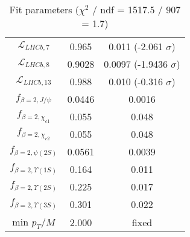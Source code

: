 \begin{table}[h!]
\begin{tabular}{c|c|c}
$\mathcal L_{LHCb,7}$ & 0.965 & 0.011 (-2.061 $\sigma$) \\
$\mathcal L_{LHCb,8}$ & 0.9028 & 0.0097 (-1.9436 $\sigma$) \\
$\mathcal L_{LHCb,13}$ & 0.988 & 0.010 (-0.316 $\sigma$) \\
$f_{\beta=2,J/\psi}$ & 0.0446 & 0.0016 \\
$f_{\beta=2,\chi_{c1}}$ & 0.055 & 0.048 \\
$f_{\beta=2,\chi_{c2}}$ & 0.055 & 0.048 \\
$f_{\beta=2,\psi(2S)}$ & 0.0561 & 0.0039 \\
$f_{\beta=2,\Upsilon(1S)}$ & 0.164 & 0.011 \\
$f_{\beta=2,\Upsilon(2S)}$ & 0.225 & 0.017 \\
$f_{\beta=2,\Upsilon(3S)}$ & 0.301 & 0.022 \\
min $p_T/M$ & 2.000 & fixed \\
\end{tabular}
\caption{Fit parameters ($\chi^2$ / ndf = 1517.5 / 907 = 1.7)}
\end{table}
